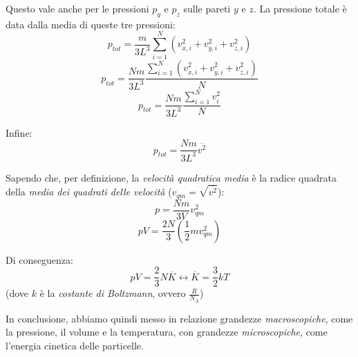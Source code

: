 \documentclass[]{article}
\begin{document}
Questo vale anche per le pressioni $p_y$ e $p_z$ sulle pareti $y$ e $z$. La pressione totale è data dalla media di queste tre pressioni:
$$p_{tot} = \frac{m}{3L^3} \sum_{i=1}^{N} (v_{x,i}^2 + v_{y,i}^2 + v_{z,i}^2)$$
$$p_{tot} = \frac{Nm}{3L^3} \frac{\sum_{i=1}^{N} (v_{x,i}^2 + v_{y,i}^2 + v_{z,i}^2)}{N}$$
$$p_{tot} = \frac{Nm}{3L^3} \frac{\sum_{i=1}^{N} v_i^2}{N}$$

Infine:
$$p_{tot} = \frac{Nm}{3L^3} \overline{v^2}$$

Sapendo che, per definizione, la \textit{velocità quadratica media} è la radice quadrata della \textit{media dei quadrati delle velocità} ($v_{qm} = \sqrt{\overline{v^2}}$):
$$p = \frac{Nm}{3V} v_{qm}^2$$
$$pV = \frac{2N}{3} (\frac{1}{2}mv_{qm}^2)$$

\vspace{2em}
Di conseguenza:
$$pV = \frac{2}{3}N \overline{K} \longleftrightarrow \overline{K} = \frac{3}{2}kT$$
(dove $k$ è la \textit{costante di Boltzmann}, ovvero $\frac{R}{N_A}$)

\vspace{3em}
In conclusione, abbiamo quindi messo in relazione grandezze \textit{macroscopiche}, come la pressione, il volume e la temperatura, con grandezze \textit{microscopiche}, come l'energia cinetica delle particelle.
\end{document}
